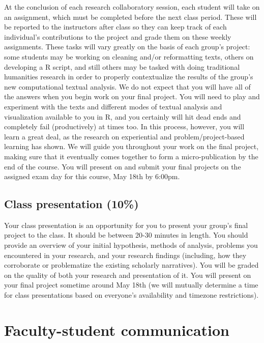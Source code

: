 \documentclass[
]{book}
\begin{document}
At the conclusion of each research collaboratory session, each student will take on an assignment, which must be completed before the next class period. These will be reported to the instructors after class so they can keep track of each individual's contributions to the project and grade them on these weekly assignments. These tasks will vary greatly on the basis of each group's project: some students may be working on cleaning and/or reformatting texts, others on developing a R script, and still others may be tasked with doing traditional humanities research in order to properly contextualize the results of the group's new computational textual analysis. We do not expect that you will have all of the answers when you begin work on your final project. You will need to play and experiment with the texts and different modes of textual analysis and visualization available to you in R, and you certainly will hit dead ends and completely fail (productively) at times too. In this process, however, you will learn a great deal, as the research on experiential and problem/project-based learning has shown. We will guide you throughout your work on the final project, making sure that it eventually comes together to form a micro-publication by the end of the course. You will present on and submit your final projects on the assigned exam day for this course, May 18th by 6:00pm.

\hypertarget{class-presentation-10}{%
\subsection{Class presentation (10\%)}\label{class-presentation-10}}

Your class presentation is an opportunity for you to present your group's final project to the class. It should be between 20-30 minutes in length. You should provide an overview of your initial hypothesis, methods of analysis, problems you encountered in your research, and your research findings (including, how they corroborate or problematize the existing scholarly narratives). You will be graded on the quality of both your research and presentation of it. You will present on your final project sometime around May 18th (we will mutually determine a time for class presentations based on everyone's availability and timezone restrictions).

\hypertarget{faculty-student-communication}{%
\section{Faculty-student communication}\label{faculty-student-communication}}
\end{document}
